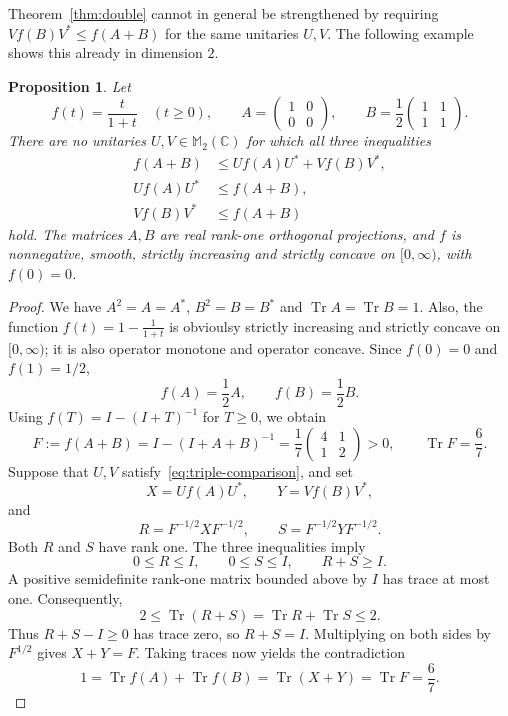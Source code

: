 \documentclass[10pt,a4paper]{amsart}
\numberwithin{equation}{section}
\newtheorem{proposition}[theorem]{Proposition}
\newcommand{\Tr}{\operatorname{Tr}}
\begin{document}
Theorem~\ref{thm:double} cannot in general be strengthened by requiring
$Vf(B)V^*\leq f(A+B)$ for the same unitaries $U,V$.
The following example shows this already in dimension $2$.

\begin{proposition}\label{prop:triple-counterexample}
Let
\[
 f(t)=\frac{t}{1+t}\quad(t\geq0),
 \qquad
 A=\begin{pmatrix}1&0\\0&0\end{pmatrix},
 \qquad
 B=\frac12\begin{pmatrix}1&1\\1&1\end{pmatrix}.
\]
There are no unitaries $U,V\in\mathbb M_2(\mathbb C)$ for which all three
inequalities
\begin{equation}\label{eq:triple-comparison}
 \begin{split}
 f(A+B)&\leq Uf(A)U^*+Vf(B)V^*,\\
 Uf(A)U^*&\leq f(A+B),\\
 Vf(B)V^*&\leq f(A+B)
 \end{split}
\end{equation}
hold. The matrices $A,B$ are real rank-one orthogonal projections,
and $f$ is nonnegative, smooth, strictly increasing and strictly
concave on $[0,\infty)$, with $f(0)=0$.
\end{proposition}

\begin{proof}
We have $A^2=A=A^*$, $B^2=B=B^*$ and
$\Tr A=\Tr B=1$. Also, the function $f(t)=1-\frac{1}{1+t}$ is obvioulsy strictly increasing and
strictly concave on $[0,\infty)$; it is also operator monotone
and operator concave.
Since $f(0)=0$ and $f(1)=1/2$,
\[
 f(A)=\frac12A,
 \qquad
 f(B)=\frac12B.
\]
Using $f(T)=I-(I+T)^{-1}$ for $T\geq0$, we obtain
\[
 F:=f(A+B)
 =I-(I+A+B)^{-1}
 =\frac17\begin{pmatrix}4&1\\1&2\end{pmatrix}>0,
 \qquad \Tr F=\frac67.
\]
Suppose that $U,V$ satisfy~\eqref{eq:triple-comparison}, and set
\[
 X=Uf(A)U^*,\qquad Y=Vf(B)V^*,
\]
and
\[
 R=F^{-1/2}XF^{-1/2},\qquad S=F^{-1/2}YF^{-1/2}.
\]
Both $R$ and $S$ have rank one. The three inequalities imply
\[
 0\leq R\leq I,\qquad 0\leq S\leq I,\qquad R+S\geq I.
\]
A positive semidefinite rank-one matrix bounded above by $I$ has
trace at most one. Consequently,
\[
 2\leq\Tr(R+S)=\Tr R+\Tr S\leq2.
\]
Thus $R+S-I\geq0$ has trace zero, so $R+S=I$.
Multiplying on both sides by $F^{1/2}$ gives $X+Y=F$.
Taking traces now yields the contradiction
\[
 1=\Tr f(A)+\Tr f(B)=\Tr(X+Y)=\Tr F=\frac67.
\]
\end{proof}
\end{document}
